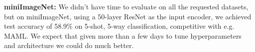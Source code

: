 \documentclass{article}
\begin{document}
{}
\textbf{miniImageNet:} We didn't have time to evaluate on all the requested datasets, but on miniImageNet, using a 50-layer ResNet as the input encoder, we achieved test accuracy of 58.9\% on 5-shot, 5-way classification, competitive with e.g. MAML. We expect that given more than a few days to tune hyperparameters and architecture we could do much better. \par
\end{document}
